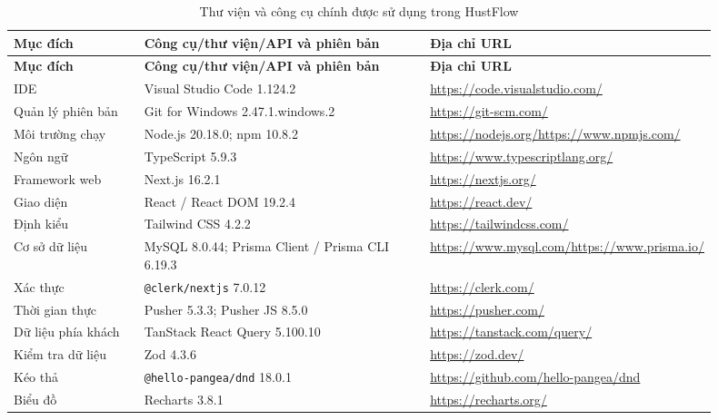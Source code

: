 \documentclass[../DoAn.tex]{subfiles}
\begin{document}
\begingroup
\scriptsize
\setlength{\tabcolsep}{4pt}
\begin{longtable}{|>{\raggedright\arraybackslash}p{0.19\linewidth}|>{\raggedright\arraybackslash}p{0.42\linewidth}|>{\raggedright\arraybackslash}p{0.29\linewidth}|}
    \caption{Thư viện và công cụ chính được sử dụng trong HustFlow}
    \label{table:chapter4_tools}\\
    \hline
    \textbf{Mục đích} & \textbf{Công cụ/thư viện/API và phiên bản} & \textbf{Địa chỉ URL} \\ \hline
    \endfirsthead
    \hline
    \textbf{Mục đích} & \textbf{Công cụ/thư viện/API và phiên bản} & \textbf{Địa chỉ URL} \\ \hline
    \endhead
    IDE & Visual Studio Code 1.124.2 & \url{https://code.visualstudio.com/} \\ \hline
    Quản lý phiên bản & Git for Windows 2.47.1.windows.2 & \url{https://git-scm.com/} \\ \hline
    Môi trường chạy & Node.js 20.18.0; npm 10.8.2 & \url{https://nodejs.org/}\newline \url{https://www.npmjs.com/} \\ \hline
    Ngôn ngữ & TypeScript 5.9.3 & \url{https://www.typescriptlang.org/} \\ \hline
    Framework web & Next.js 16.2.1 & \url{https://nextjs.org/} \\ \hline
    Giao diện & React / React DOM 19.2.4 & \url{https://react.dev/} \\ \hline
    Định kiểu & Tailwind CSS 4.2.2 & \url{https://tailwindcss.com/} \\ \hline
    Cơ sở dữ liệu & MySQL 8.0.44; Prisma Client / Prisma CLI 6.19.3 & \url{https://www.mysql.com/}\newline \url{https://www.prisma.io/} \\ \hline
    Xác thực & \texttt{@clerk/nextjs} 7.0.12 & \url{https://clerk.com/} \\ \hline
    Thời gian thực & Pusher 5.3.3; Pusher JS 8.5.0 & \url{https://pusher.com/} \\ \hline
    Dữ liệu phía khách & TanStack React Query 5.100.10 & \url{https://tanstack.com/query/} \\ \hline
    Kiểm tra dữ liệu & Zod 4.3.6 & \url{https://zod.dev/} \\ \hline
    Kéo thả & \texttt{@hello-pangea/dnd} 18.0.1 & \url{https://github.com/hello-pangea/dnd} \\ \hline
    Biểu đồ & Recharts 3.8.1 & \url{https://recharts.org/} \\ \hline

\end{longtable}
\end{document}
